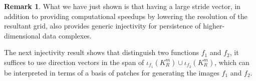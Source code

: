 \documentclass[conference]{IEEEtran}
\theoremstyle{definition}
\numberwithin{figure}{section}
\newtheorem{remark}[theorem]{Remark}
\begin{document}
\begin{remark}
	What we have just shown is that having a large stride vector, in addition to providing computational speedups by lowering the resolution of the resultant grid, also provides generic injectivity for persistence of higher-dimensional data complexes.
\end{remark}

The next injectivity result shows that distinguish two functions $f_1$ and $f_2$, it suffices to use direction vectors in the span of $\iota_{f_1}(K_R^m) \cup \iota_{f_2}(K_R^m)$, which can be interpreted in terms of a basis of patches for generating the images $f_1$ and $f_2$.

\newpage





 
\end{document}
